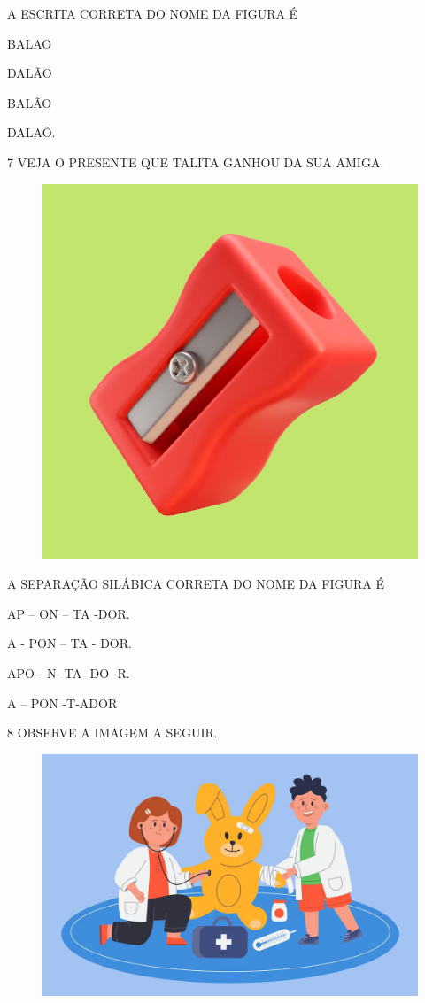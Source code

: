 A ESCRITA CORRETA DO NOME DA FIGURA É

\begin{escolha}

\item BALAO

\item DALÃO

\item BALÃO

\item DALAÕ.

\end{escolha}

\num{7} VEJA O PRESENTE QUE TALITA GANHOU DA SUA AMIGA.

\begin{figure}[H]
\centering
\includegraphics[width=.6\textwidth]{./media/image233.png}
\end{figure}

A SEPARAÇÃO SILÁBICA CORRETA DO NOME DA FIGURA É

\begin{escolha}

\item AP – ON – TA -DOR.

\item A - PON – TA - DOR.

\item APO - N- TA- DO -R.

\item A – PON -T-ADOR

\end{escolha}

\num{8} OBSERVE A IMAGEM A SEGUIR.

\begin{figure}[H]
\centering
\includegraphics[width=.7\textwidth]{./media/image234.png}
\end{figure}

